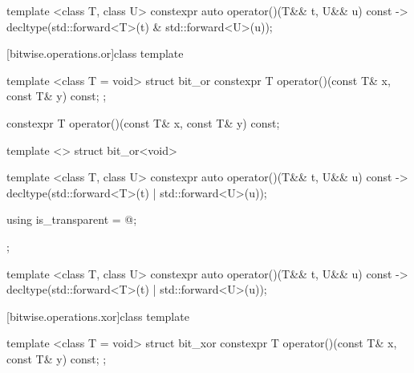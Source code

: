%
\begin{itemdecl}
template <class T, class U> constexpr auto operator()(T&& t, U&& u) const
    -> decltype(std::forward<T>(t) & std::forward<U>(u));
\end{itemdecl}

\begin{itemdescr}
\pnum\returns {}
\end{itemdescr}

[bitwise.operations.or]{class template }

%
\begin{itemdecl}
template <class T = void> struct bit_or {
  constexpr T operator()(const T& x, const T& y) const;
};
\end{itemdecl}

%
\begin{itemdecl}
constexpr T operator()(const T& x, const T& y) const;
\end{itemdecl}

\begin{itemdescr}
\pnum\returns {}
\end{itemdescr}

%
\begin{itemdecl}
template <> struct bit_or<void> {
  template <class T, class U> constexpr auto operator()(T&& t, U&& u) const
    -> decltype(std::forward<T>(t) | std::forward<U>(u));

  using is_transparent = @\unspec@;
};
\end{itemdecl}

%
\begin{itemdecl}
template <class T, class U> constexpr auto operator()(T&& t, U&& u) const
    -> decltype(std::forward<T>(t) | std::forward<U>(u));
\end{itemdecl}

\begin{itemdescr}
\pnum\returns {}
\end{itemdescr}

[bitwise.operations.xor]{class template }

%
\begin{itemdecl}
template <class T = void> struct bit_xor {
  constexpr T operator()(const T& x, const T& y) const;
};
\end{itemdecl}

